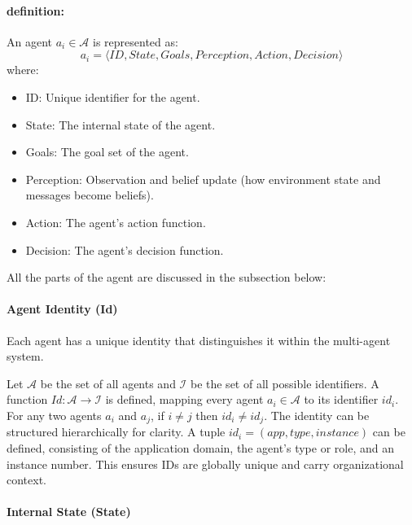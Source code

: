 \paragraph{definition:}
An agent $a_i \in \mathcal{A}$ is represented as:
\begin{equation*}
    a_i = \langle ID, State, Goals, Perception, Action, Decision \rangle
\end{equation*}
where:
\begin{itemize}
    \item ID: Unique identifier for the agent.
    \item State: The internal state of the agent.
    \item Goals: The goal set of the agent.
    \item Perception: Observation and belief update (how environment state and messages become beliefs).
    \item Action: The agent’s action function.
    \item Decision: The agent’s decision function.
    
\end{itemize}
All the parts of the agent are discussed in the subsection below:

\paragraph{Agent Identity (Id)}

Each agent has a unique identity that distinguishes it within the multi-agent system. 

Let $\mathcal{A}$ be the set of all agents and $\mathcal{I}$ be the set of all possible identifiers. A function $Id: \mathcal{A} \to \mathcal{I}$ is defined, mapping every agent $a_i \in \mathcal{A}$ to its identifier $id_i$. For any two agents $a_i$ and $a_j$, if $i \neq j$ then $id_i \neq id_j$. The identity can be structured hierarchically for clarity. A tuple $id_i = (app, type, instance)$ can be defined, consisting of the application domain, the agent’s type or role, and an instance number. This ensures IDs are globally unique and carry organizational context. 


\paragraph{Internal State (State)}

